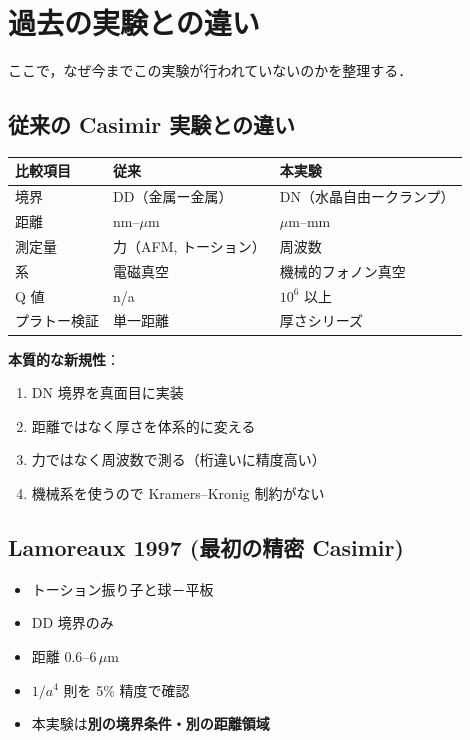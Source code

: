 \documentclass[11pt,a4paper]{article}
\begin{document}
\section{過去の実験との違い}

ここで，なぜ今までこの実験が行われていないのかを整理する．

\subsection{従来の Casimir 実験との違い}

\begin{center}
\begin{tabular}{lll}
\toprule
比較項目 & 従来 & 本実験 \\
\midrule
境界 & DD（金属ー金属）& DN（水晶自由ークランプ）\\
距離 & nm--$\mu$m & $\mu$m--mm \\
測定量 & 力（AFM, トーション）& 周波数 \\
系 & 電磁真空 & 機械的フォノン真空 \\
Q 値 & n/a & $10^6$ 以上 \\
プラトー検証 & 単一距離 & 厚さシリーズ \\
\bottomrule
\end{tabular}
\end{center}

\textbf{本質的な新規性}：
\begin{enumerate}
\item DN 境界を真面目に実装
\item 距離ではなく厚さを体系的に変える
\item 力ではなく周波数で測る（桁違いに精度高い）
\item 機械系を使うので Kramers--Kronig 制約がない
\end{enumerate}

\subsection{Lamoreaux 1997 (最初の精密 Casimir)}

\begin{itemize}
\item トーション振り子と球－平板
\item DD 境界のみ
\item 距離 $0.6$--$6\,\mu$m
\item $1/a^4$ 則を 5\% 精度で確認
\item 本実験は\textbf{別の境界条件・別の距離領域}
\end{itemize}
\end{document}

